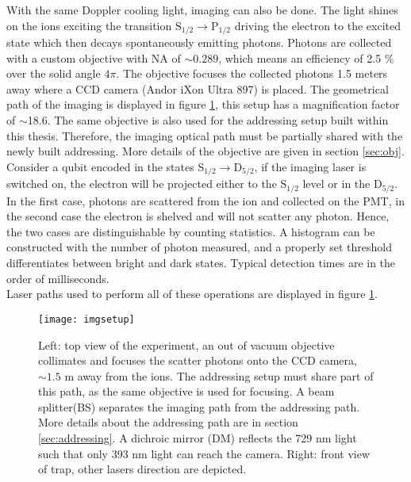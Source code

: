 With the same Doppler cooling light, imaging can also be done. The light shines on the ions exciting the transition $\text{S}_{1/2} \to \text{P}_{1/2}$ driving the electron to the excited state which then decays spontaneously emitting photons. Photons are collected with a custom objective with NA of $\sim 0.289$, which means an efficiency of 2.5 \% over the solid angle $4\pi$. The objective focuses the collected photons 1.5 meters away where a CCD camera (Andor iXon Ultra 897) is placed. The geometrical path of the imaging is displayed in figure \ref{imgsetup}, this setup has a magnification factor of $\sim$18.6. The same objective is also used for the addressing setup built within this thesis. Therefore, the imaging optical path must be partially shared with the newly built addressing. More details of the objective are given in section \ref{sec:obj}.\\
Consider a qubit encoded in the states $\text{S}_{1/2} \to \text{D}_{5/2}$, if the imaging laser is switched on, the electron will be projected either to the $\text{S}_{1/2}$ level or in the $\text{D}_{5/2} $. In the first case, photons are scattered from the ion and collected on the PMT, in the second case the electron is shelved and will not scatter any photon. Hence, the two cases are distinguishable by counting statistics. A histogram can be constructed  with the number of photon measured, and a properly set threshold differentiates between bright and dark states. Typical detection times are in the order of milliseconds.\\
Laser paths used to perform all of these operations are displayed in figure \ref{imgsetup}.

\begin{figure}
\centering
\texttt{[image: imgsetup]}
\caption[Caption for LOF]{Left: top view of the experiment, an out of vacuum objective collimates and focuses the scatter photons onto the CCD camera, $\sim 1.5$ m away from the ions. The addressing setup must share part of this path, as the same objective is used for focusing.
A beam splitter\footnotemark (BS) separates the imaging path from the addressing path. More details about the addressing path are in section \ref{sec:addressing}.
A dichroic mirror (DM) reflects the 729 nm light such that only 393 nm light can reach the camera. Right: front view of trap, other lasers direction are depicted.}
\label{imgsetup}
\end{figure}

